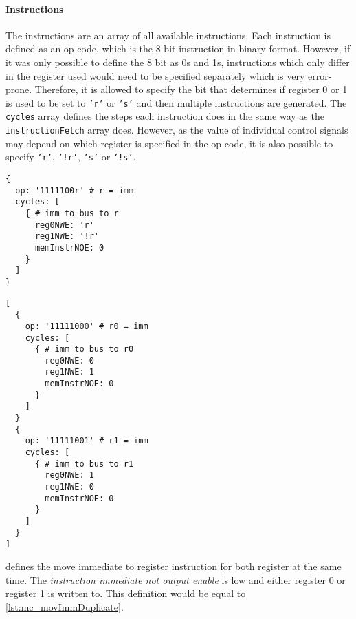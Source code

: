 \paragraph{Instructions} The instructions are an array of all available instructions.
Each instruction is defined as an op code, which is the 8 bit instruction in binary format.
However, if it was only possible to define the 8 bit as 0s and 1s, instructions which only differ in the register used would need to be specified separately which is very error-prone.
Therefore, it is allowed to specify the bit that determines if register 0 or 1 is used to be set to \texttt{'r'} or \texttt{'s'} and then multiple instructions are generated.
The \texttt{cycles} array defines the steps each instruction does in the same way as the \texttt{instructionFetch} array does.
However, as the value of individual control signals may depend on which register is specified in the op code, it is also possible to specify \texttt{'r'}, \texttt{'!r'}, \texttt{'s'} or \texttt{'!s'}.

\begin{listing}[t]
  \begin{sublisting}[b]{.45\textwidth}
    \begin{verbatim}
{
  op: '1111100r' # r = imm
  cycles: [
    { # imm to bus to r
      reg0NWE: 'r'
      reg1NWE: '!r'
      memInstrNOE: 0
    }
  ]
}
    \end{verbatim}
    \caption{Definition using `r' in the opcode.}
    \label{lst:mc_movImm}
  \end{sublisting}
  \begin{sublisting}[b]{.5\textwidth}
    \begin{verbatim}
[
  {
    op: '11111000' # r0 = imm
    cycles: [
      { # imm to bus to r0
        reg0NWE: 0
        reg1NWE: 1
        memInstrNOE: 0
      }
    ]
  }
  {
    op: '11111001' # r1 = imm
    cycles: [
      { # imm to bus to r1
        reg0NWE: 1
        reg1NWE: 0
        memInstrNOE: 0
      }
    ]
  }
]
    \end{verbatim}
    \caption{Equivalent definition of both separate instructions.}
    \label{lst:mc_movImmDuplicate}
  \end{sublisting}
  \caption{Definition of the move immediate to register instruction for the microcode generation.}
\end{listing}
 defines the move immediate to register instruction for both register at the same time.
The \emph{instruction immediate not output enable} is low and either register 0 or register 1 is written to.
This definition would be equal to \cref{lst:mc_movImmDuplicate}.

